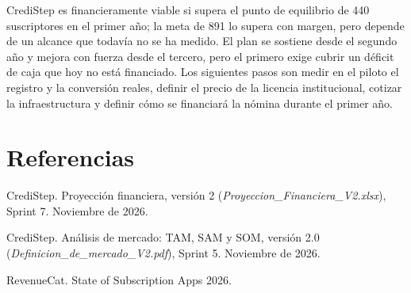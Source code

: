 \documentclass[11pt,a4paper]{article}
\begin{document}
CrediStep es financieramente viable si supera el punto de equilibrio de 440 suscriptores en el primer año; la meta de 891 lo supera con margen, pero depende de un alcance que todavía no se ha medido. El plan se sostiene desde el segundo año y mejora con fuerza desde el tercero, pero el primero exige cubrir un déficit de caja que hoy no está financiado. Los siguientes pasos son medir en el piloto el registro y la conversión reales, definir el precio de la licencia institucional, cotizar la infraestructura y definir cómo se financiará la nómina durante el primer año.

\section*{Referencias}
\begin{enumerate}[label={[\arabic*]},leftmargin=2em]
  \item CrediStep. Proyección financiera, versión 2 (\textit{Proyeccion\_Financiera\_V2.xlsx}), Sprint 7. Noviembre de 2026.
  \item CrediStep. Análisis de mercado: TAM, SAM y SOM, versión 2.0 (\textit{Definicion\_de\_mercado\_V2.pdf}), Sprint 5. Noviembre de 2026.
  \item RevenueCat. State of Subscription Apps 2026.
\end{enumerate}
\end{document}
